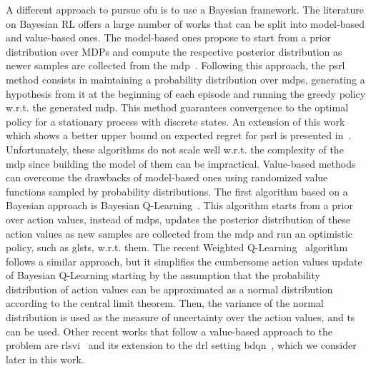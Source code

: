 A different approach to pursue \gls{ofu} is to use a Bayesian framework. The literature on Bayesian RL offers a large number of works that can be split into model-based and value-based ones. The model-based ones propose to start from a prior distribution over MDPs and compute the respective posterior distribution as newer samples are collected from the \gls{mdp}~\cite{dearden1999model, kolter2009near}. Following this approach, the \gls{psrl}~\cite{strens2000bayesian} method consists in maintaining a probability distribution over \glspl{mdp}, generating a hypothesis from it at the beginning of each episode and running the greedy policy w.r.t. the generated \gls{mdp}. This method guarantees convergence to the optimal policy for a stationary process with discrete states. An extension of this work which shows a better upper bound on expected regret for \gls{psrl} is presented in~\cite{osband2013more}. Unfortunately, these algorithms do not scale well w.r.t. the complexity of the \gls{mdp} since building the model of them can be impractical.
Value-based methods can overcome the drawbacks of model-based ones using randomized value functions sampled by probability distributions. The first algorithm based on a Bayesian approach is Bayesian Q-Learning~\cite{dearden1998bayesian}. This algorithm starts from a prior over action values, instead of \glspl{mdp}, updates the posterior distribution of these action values as new samples are collected from the \gls{mdp} and run an optimistic policy, such as gls{ts}, w.r.t. them. The recent Weighted Q-Learning~\cite{d2016estimating} algorithm follows a similar approach, but it simplifies the cumbersome action values update of Bayesian Q-Learning starting by the assumption that the probability distribution of action values can be approximated as a normal distribution according to the central limit theorem. Then, the variance of the normal distribution is used as the measure of uncertainty over the action values, and \gls{ts} can be used. 
Other recent works that follow a value-based approach to the problem are \gls{rlsvi}~\cite{osband2016generalization} and its extension to the \gls{drl} setting \gls{bdqn}~\cite{osband2016deep}, which we consider later in this work.

